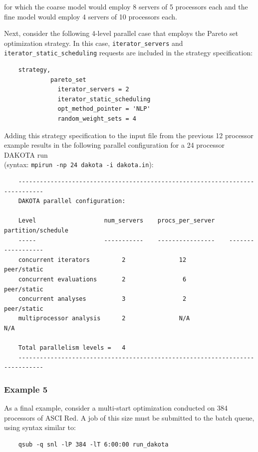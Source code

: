 for which the coarse model would employ 8 servers of 5 processors each
and the fine model would employ 4 servers of 10 processors each.

Next, consider the following 4-level parallel case that employs the
Pareto set optimization strategy. In this case,
\texttt{iterator\_servers} and \texttt{iterator\_static\_scheduling}
requests are included in the strategy specification:
\begin{small}
\begin{verbatim}
    strategy,
             pareto_set
               iterator_servers = 2
               iterator_static_scheduling
               opt_method_pointer = 'NLP'
               random_weight_sets = 4
\end{verbatim}
\end{small}

Adding this strategy specification to the input file from the previous
12 processor example results in the following parallel configuration
for a 24 processor DAKOTA run \\
(syntax: \texttt{mpirun -np 24 dakota -i dakota.in}):
\begin{small}
\begin{verbatim}
    -----------------------------------------------------------------------------
    DAKOTA parallel configuration:

    Level                   num_servers    procs_per_server    partition/schedule
    -----                   -----------    ----------------    ------------------
    concurrent iterators         2               12              peer/static
    concurrent evaluations       2                6              peer/static
    concurrent analyses          3                2              peer/static
    multiprocessor analysis      2               N/A                N/A

    Total parallelism levels =   4
    -----------------------------------------------------------------------------
\end{verbatim}
\end{small}

\subsubsection{Example 5}\label{parallel:spec:multi:example5}

As a final example, consider a multi-start optimization conducted on
384 processors of ASCI Red. A job of this size must be submitted to
the batch queue, using syntax similar to:
\begin{small}
\begin{verbatim}
    qsub -q snl -lP 384 -lT 6:00:00 run_dakota
\end{verbatim}
\end{small}

